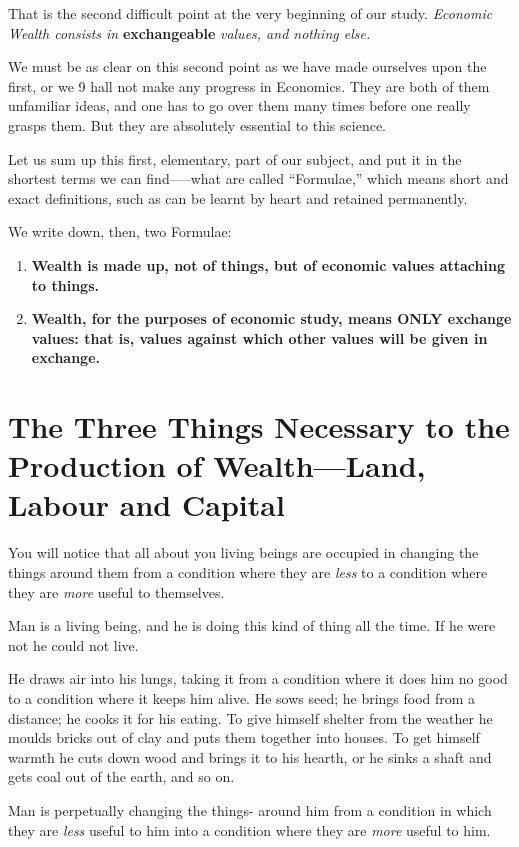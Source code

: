 \documentclass{book}
\begin{document}
That is the second difficult point at the very beginning of our study. \emph{Economic Wealth consists in} \textbf{exchangeable} \emph{values, and nothing else.}

We must be as clear on this second point as we have made ourselves upon the first, or we 9 hall not make any progress in Economics. They are both of them unfamiliar ideas, and one has to go over them many times before one really grasps them. But they are absolutely essential to this science.

Let us sum up this first, elementary, part of our subject, and put it in the shortest terms we can find—–what are called “Formulae,” which means short and exact definitions, such as can be learnt by heart and retained permanently.

We write down, then, two Formulae:

\begin{enumerate}
	\item \textbf{Wealth is made up, not of things, but of economic values attaching to things.}


	\item \textbf{Wealth, for the purposes of economic study, means ONLY exchange values: that is, values against which other values will be given in exchange.}



\end{enumerate}
\chapter{The Three Things Necessary to the Production of Wealth—Land, Labour and Capital}
\label{chapter-2}
You will notice that all about you living beings are occupied in changing the things around them from a condition where they are \emph{less} to a condition where they are \emph{more} useful to themselves.

Man is a living being, and he is doing this kind of thing all the time. If he were not he could not live.

He draws air into his lungs, taking it from a condition where it does him no good to a condition where it keeps him alive. He sows seed; he brings food from a distance; he cooks it for his eating. To give himself shelter from the weather he moulds bricks out of clay and puts them together into houses. To get himself warmth he cuts down wood and brings it to his hearth, or he sinks a shaft and gets coal out of the earth, and so on.

Man is perpetually changing the things- around him from a condition in which they are \emph{less} useful to him into a condition where they are \emph{more} useful to him.
\end{document}
